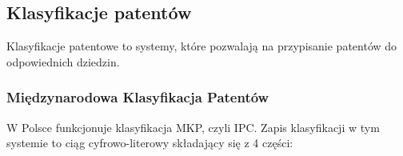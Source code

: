   \newpage\subsection
{Klasyfikacje patentów}

Klasyfikacje patentowe to systemy, które pozwalają na przypisanie
patentów do odpowiednich dziedzin.



  \subsubsection
{Międzynarodowa Klasyfikacja Patentów}

W Polsce funkcjonuje klasyfikacja
\ac{MKP}, czyli \ac{IPC}. Zapis klasyfikacji w tym systemie to ciąg
cyfrowo-literowy składający się z 4 części:



